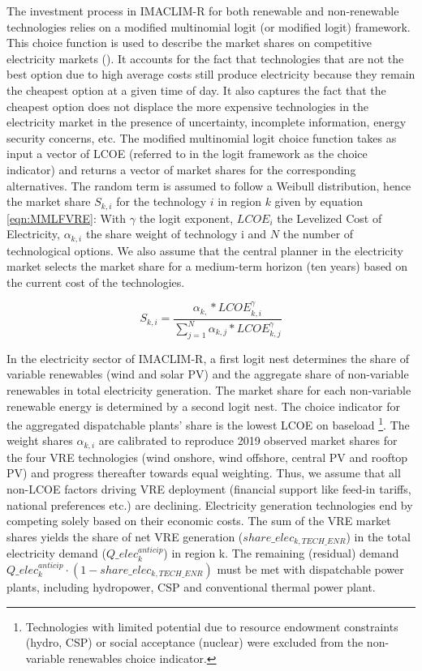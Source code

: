 The investment process in IMACLIM-R for both renewable and non-renewable technologies relies on a modified multinomial logit (or modified logit) framework. This choice function is used to describe the market shares on competitive electricity markets (\cite{Clarke1993}). It accounts for the fact that technologies that are not the best option due to high average costs still produce electricity because they remain the cheapest option at a given time of day. It also captures the fact that the cheapest option does not displace the more expensive technologies in the electricity market in the presence of uncertainty, incomplete information, energy security concerns, etc. 
The modified multinomial logit choice function takes as input a vector of LCOE (referred to in the logit framework as the choice indicator) and returns a vector of market shares for the corresponding alternatives.  The random term is assumed to follow a Weibull distribution, hence the market share $S_{k,i}$ for the technology $i$ in region $k$ given by equation \ref{eqn:MMLFVRE}:
With $\gamma$ the logit exponent, $LCOE_{i}$ the Levelized Cost of Electricity, $\alpha_{k,i}$ the share weight of technology i and $N$ the number of technological options.
We also assume that the central planner in the electricity market selects the market share for a medium-term horizon (ten years) based on the current cost of the technologies.


\begin{dmath}
    S_{k,i} = \frac{\alpha_{k,}*LCOE_{k,i}^{\gamma}}{\sum_{j=1}^{N} \alpha_{k,j}*LCOE_{k,j}^{\gamma}}
    \label{eqn:MMLFVRE}
\end{dmath}

In the electricity sector of IMACLIM-R, a first logit nest determines the share of variable renewables (wind and solar PV) and the aggregate share of non-variable renewables in total electricity generation. The market share for each non-variable renewable energy is determined by a second logit nest.
The choice indicator for the aggregated dispatchable plants’ share is the lowest LCOE on baseload
\footnote{Technologies with limited potential due to resource endowment constraints (hydro, CSP) or social acceptance (nuclear) were excluded from the non-variable renewables choice indicator.}. The weight shares $\alpha_{k,i}$ are calibrated to reproduce 2019 observed market shares for the four VRE technologies (wind onshore, wind offshore, central PV and rooftop PV) and progress thereafter towards equal weighting. Thus, we assume that all non-LCOE factors driving VRE deployment (financial support like feed-in tariffs, national preferences etc.) are declining. Electricity generation technologies end by competing solely based on their economic costs.
The sum of the VRE market shares yields the share of net VRE generation ($share\_elec_{k,TECH\_ENR}$) in the total electricity demand ($Q\_elec_k^{anticip}$)  in region k. The remaining (residual) demand $Q\_elec_k^{anticip} \cdot (1-share\_elec_{k,TECH\_ENR})$ must be met with dispatchable power plants, including hydropower, CSP and conventional thermal power plant.

